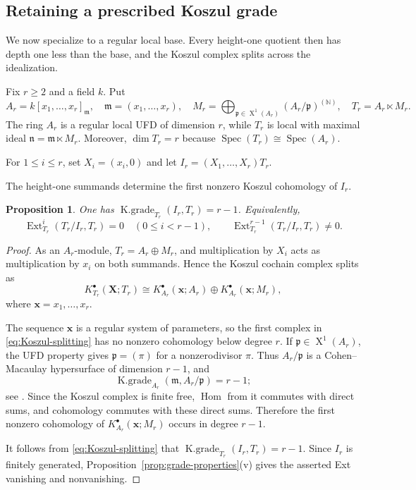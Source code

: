 \documentclass[11pt]{amsart}
\numberwithin{equation}{section}
\newtheorem{proposition}[theorem]{Proposition}
\theoremstyle{definition}
\theoremstyle{remark}
\newcommand{\Ext}{\operatorname{Ext}}
\newcommand{\Hom}{\operatorname{Hom}}
\newcommand{\Spec}{\operatorname{Spec}}
\newcommand{\Kgr}{\operatorname{K.grade}}
\newcommand{\SpecOne}{\operatorname{X}^{1}}
\begin{document}
\subsection{Retaining a prescribed Koszul grade}

We now specialize to a regular local base.  Every height-one quotient then has depth one less than the base, and the Koszul complex splits across the idealization.

Fix $r\geq2$ and a field $k$.  Put
\begin{equation}\label{eq:regular-large-idealization}
 A_r=k[x_1,\ldots,x_r]_{\mathfrak m},
 \quad \mathfrak m=(x_1,\ldots,x_r),
 \quad
 M_r=\bigoplus_{\mathfrak p\in\SpecOne(A_r)}(A_r/\mathfrak p)^{(\mathbb N)},
 \quad
 T_r=A_r\ltimes M_r.
\end{equation}
The ring $A_r$ is a regular local UFD of dimension $r$, while $T_r$ is local with maximal ideal $\mathfrak n=\mathfrak m\ltimes M_r$.  Moreover, $\dim T_r=r$ because $\Spec(T_r)\cong\Spec(A_r)$.

For $1\leq i\leq r$, set $X_i=(x_i,0)$ and let $I_r=(X_1,\ldots,X_r)T_r$.

The height-one summands determine the first nonzero Koszul cohomology of $I_r$.

\begin{proposition}\label{prop:grade-Ir}
One has $\Kgr_{T_r}(I_r,T_r)=r-1$.  Equivalently,
\[
 \Ext_{T_r}^i(T_r/I_r,T_r)=0\quad(0\leq i<r-1),
 \qquad
 \Ext_{T_r}^{r-1}(T_r/I_r,T_r)\neq0.
\]
\end{proposition}

\begin{proof}
As an $A_r$-module, $T_r=A_r\oplus M_r$, and multiplication by $X_i$ acts as multiplication by $x_i$ on both summands.  Hence the Koszul cochain complex splits as
\begin{equation}\label{eq:Koszul-splitting}
 K^\bullet_{T_r}(\mathbf X;T_r)
 \cong K^\bullet_{A_r}(\mathbf x;A_r)
 \oplus K^\bullet_{A_r}(\mathbf x;M_r),
\end{equation}
where $\mathbf x=x_1,\ldots,x_r$.

The sequence $\mathbf x$ is a regular system of parameters, so the first complex in \eqref{eq:Koszul-splitting} has no nonzero cohomology below degree $r$.  If $\mathfrak p\in\SpecOne(A_r)$, the UFD property gives $\mathfrak p=(\pi)$ for a nonzerodivisor $\pi$.  Thus $A_r/\mathfrak p$ is a Cohen--Macaulay hypersurface of dimension $r-1$, and
\[
 \Kgr_{A_r}(\mathfrak m,A_r/\mathfrak p)=r-1;
\]
see \cite{BrunsHerzog,Eisenbud}.  Since the Koszul complex is finite free, $\Hom$ from it commutes with direct sums, and cohomology commutes with these direct sums.  Therefore the first nonzero cohomology of $K^\bullet_{A_r}(\mathbf x;M_r)$ occurs in degree $r-1$.

It follows from \eqref{eq:Koszul-splitting} that $\Kgr_{T_r}(I_r,T_r)=r-1$.  Since $I_r$ is finitely generated, Proposition~\ref{prop:grade-properties}(v) gives the asserted Ext vanishing and nonvanishing.
\end{proof}
\end{document}
